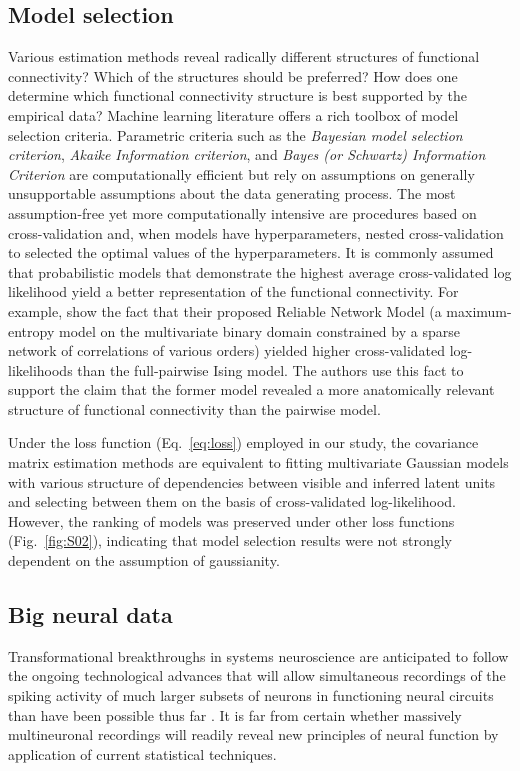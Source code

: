 \documentclass[10pt]{article}
\begin{document}
\subsection*{Model selection}
Various estimation methods reveal radically different structures of functional connectivity? Which of the structures should be preferred? How does one determine which functional connectivity structure is best supported by the empirical data? Machine learning literature offers a rich toolbox of model selection criteria. Parametric criteria such as the \emph{Bayesian model selection criterion}, \emph{Akaike Information criterion}, and \emph{Bayes (or Schwartz) Information Criterion} are computationally efficient but rely on assumptions on generally unsupportable assumptions about the data generating process.  The most assumption-free yet more computationally intensive are procedures based on cross-validation \cite{Arlot:2010} and, when models have hyperparameters, nested cross-validation to selected the optimal values of the hyperparameters. It is commonly assumed that probabilistic models that demonstrate the highest average cross-validated log likelihood yield a better representation of the functional connectivity. For example, \cite{Ganmor:2011} show the fact that their proposed Reliable Network Model (a maximum-entropy model on the multivariate binary domain constrained by a sparse network of correlations of various orders) yielded higher cross-validated log-likelihoods than the full-pairwise Ising model. The authors use this fact to support the claim that the former model revealed a more anatomically relevant structure of functional connectivity than the pairwise model.

Under the loss function (Eq.~\ref{eq:loss}) employed in our study, the covariance matrix estimation methods are equivalent to fitting multivariate Gaussian models with various structure of dependencies between visible and inferred latent units and selecting between them on the basis of cross-validated log-likelihood. However, the ranking of models was preserved under other loss functions (Fig.~\ref{fig:S02}), indicating that model selection results were not strongly dependent on the assumption of gaussianity. 

\subsection*{Big neural data}
Transformational breakthroughs in systems neuroscience are anticipated to follow the ongoing technological advances that will allow simultaneous recordings of the spiking activity of much larger subsets of neurons in functioning neural circuits than have been possible thus far \cite{Alivisatos:2013}. It is far from certain whether massively multineuronal recordings will readily reveal new principles of neural function by application of current statistical techniques. 
\end{document}
